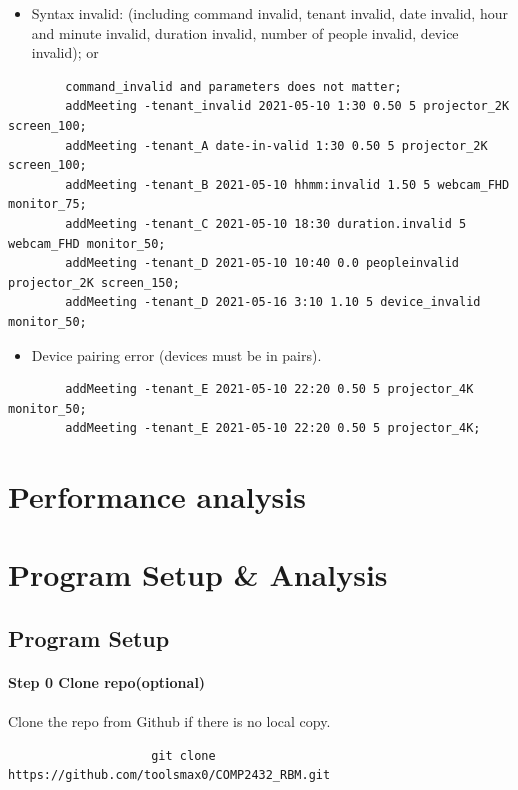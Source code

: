 \documentclass{article}
\begin{document}
        \begin{itemize}
        \item Syntax invalid: (including command invalid, tenant invalid, date invalid, hour and minute invalid, duration invalid, number of people invalid, device invalid); or
        \end{itemize}
        
        \begin{verbatim}
        command_invalid and parameters does not matter;
        addMeeting -tenant_invalid 2021-05-10 1:30 0.50 5 projector_2K screen_100;
        addMeeting -tenant_A date-in-valid 1:30 0.50 5 projector_2K screen_100;
        addMeeting -tenant_B 2021-05-10 hhmm:invalid 1.50 5 webcam_FHD monitor_75;
        addMeeting -tenant_C 2021-05-10 18:30 duration.invalid 5 webcam_FHD monitor_50;
        addMeeting -tenant_D 2021-05-10 10:40 0.0 peopleinvalid projector_2K screen_150;
        addMeeting -tenant_D 2021-05-16 3:10 1.10 5 device_invalid monitor_50;
        \end{verbatim}
        \begin{itemize}
        \item Device pairing error (devices must be in pairs).
        \end{itemize}
        \begin{verbatim}
        addMeeting -tenant_E 2021-05-10 22:20 0.50 5 projector_4K monitor_50; 
        addMeeting -tenant_E 2021-05-10 22:20 0.50 5 projector_4K; 
        \end{verbatim}
        

    \cleardoublepage
    \section{Performance analysis}

    \cleardoublepage
    \section{Program Setup \& Analysis}
        \subsection{Program Setup}
            \paragraph{Step 0 Clone repo(optional)}
            \paragraph{}
                Clone the repo from Github if there is no local copy.
                \begin{verbatim}
                    git clone https://github.com/toolsmax0/COMP2432_RBM.git
                \end{verbatim}
\end{document}
